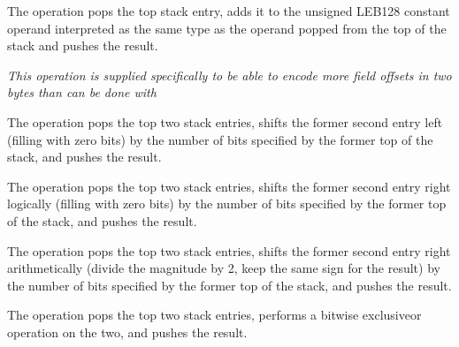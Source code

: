 \begin{enumerate}[1. ]
\itembfnl{\DWOPplusuconstTARG}
The \DWOPplusuconstNAME{} operation pops the top stack entry,
adds it to the unsigned LEB128
constant operand 
interpreted as the same type as the operand popped from the 
top of the stack and pushes the result.

\textit{This operation is supplied specifically to be
able to encode more field offsets in two bytes than can be
done with
}

\itembfnl{\DWOPshlTARG}
The \DWOPshlNAME{} operation pops the top two stack entries,
shifts the former second entry left (filling with zero bits)
by the number of bits specified by the former top of the stack,
and pushes the result.

\itembfnl{\DWOPshrTARG}
The \DWOPshrNAME{} operation pops the top two stack entries,
shifts the former second entry right logically (filling with
zero bits) by the number of bits specified by the former top
of the stack, and pushes the result.

\itembfnl{\DWOPshraTARG}
The \DWOPshraNAME{} operation pops the top two stack entries,
shifts the former second entry right arithmetically (divide
the magnitude by 2, keep the same sign for the result) by
the number of bits specified by the former top of the stack,
and pushes the result.

\itembfnl{\DWOPxorTARG}
The \DWOPxorNAME{} operation pops the top two stack entries,
performs a bitwise exclusive\dash or operation on the two, and
pushes the result.

\end{enumerate}

